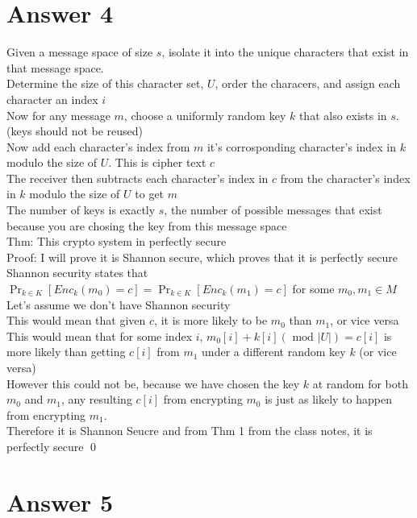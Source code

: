 \documentclass[11pt]{article}
\theoremstyle{definition}
\begin{document}
\section*{Answer 4}
Given a message space of size $s$, isolate it into the unique characters that exist in that message space.\\
Determine the size of this character set, $U$, order the characers, and assign each character an index $i$\\
Now for any message $m$, choose a uniformly random key $k$ that also exists in $s$. (keys should not be reused)\\
Now add each character's index from $m$ it's corrosponding character's index in $k$ modulo the size of $U$.  This is cipher text $c$\\
The receiver then subtracts each character's index in $c$ from the character's index in $k$ modulo the size of $U$ to get $m$\\
The number of keys is exactly $s$, the number of possible messages that exist because you are chosing the key from this message space\\
\newline
Thm: This crypto system in perfectly secure\\
\newline
Proof: I will prove it is Shannon secure, which proves that it is perfectly secure\\
Shannon security states that $\Pr_{k \in K}[Enc_k(m_0) = c] = \Pr_{k \in K}[Enc_k(m_1) = c]$ for some $m_0,m_1 \in M$\\
Let's assume we don't have Shannon security\\
\newline
This would mean that given $c$, it is more likely to be $m_0$ than $m_1$, or vice versa\\
This would mean that for some index $i$, $m_0[i] + k[i] (\text{ mod } |U|) = c[i]$ is more likely than getting $c[i]$ from $m_1$ under a different random key $k$ (or vice versa)\\
However this could not be, because we have chosen the key $k$ at random for both $m_0$ and $m_1$, any resulting $c[i]$ from encrypting $m_0$ is just as likely to happen from encrypting $m_1$.\\
Therefore it is Shannon Seucre and from Thm 1 from the class notes, it is perfectly secure \qed


\section*{Answer 5}
\end{document}
